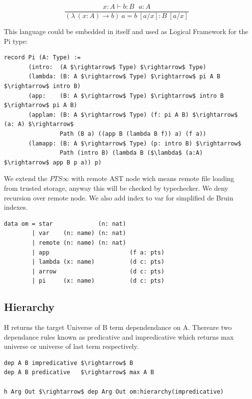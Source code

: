 \documentclass[11pt,oneside]{article}
\begin{document}
\begin{equation}
\tag{$\beta$-computation}
\dfrac
{x:A \vdash b: B\ \ \ a:A}
{(\lambda\ (x:A) \rightarrow b)\ a = b\ [a/x] : B\ [a/x]}
\end{equation}

\vspace{0.5cm}
This language could be embedded in itself and used
as Logical Framework for the Pi type:

\begin{lstlisting}[mathescape=true]
record Pi (A: Type) :=
       (intro:  (A $\rightarrow$ Type) $\rightarrow$ Type)
       (lambda: (B: A $\rightarrow$ Type) $\rightarrow$ pi A B $\rightarrow$ intro B)
       (app:    (B: A $\rightarrow$ Type) $\rightarrow$ intro B $\rightarrow$ pi A B)
       (applam: (B: A $\rightarrow$ Type) (f: pi A B) $\rightarrow$ (a: A) $\rightarrow$
                Path (B a) ((app B (lambda B f)) a) (f a))
       (lamapp: (B: A $\rightarrow$ Type) (p: intro B) $\rightarrow$
                Path (intro B) (lambda B ($\lambda$ (a:A) $\rightarrow$ app B p a)) p)

\end{lstlisting}

We extend the $PTS\infty$ with remote AST node wich means remote file loading
from trusted storage, anyway this will be checked by typechecker. We deny recursion
over remote node. We also add index to var for simplified de Bruin indexes.

\begin{lstlisting}[mathescape=true]
data om = star             (n: nat)
        | var    (n: name) (n: nat)
        | remote (n: name) (n: nat)
        | app                       (f a: pts)
        | lambda (x: name)          (d c: pts)
        | arrow                     (d c: pts)
        | pi     (x: name)          (d c: pts)
\end{lstlisting}

\newpage

\subsection{Hierarchy}
H returns the target Universe of B term dependendance on A. Thereare two dependance rules known
as predicative and impredicative which returns max universe or universe of last term respectively.

\begin{lstlisting}[mathescape=true]
dep A B impredicative $\rightarrow$ B
dep A B predicative   $\rightarrow$ max A B

h Arg Out $\rightarrow$ dep Arg Out om:hierarchy(impredicative)
\end{lstlisting}
\end{document}
